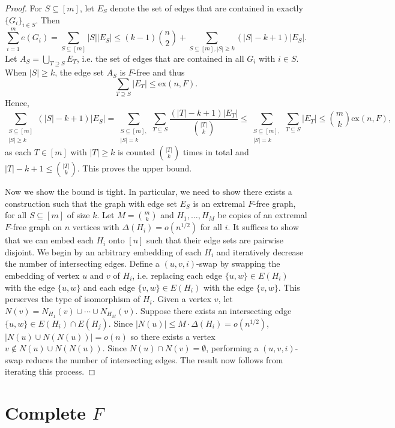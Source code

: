 \documentclass[10pt, reqno]{report}
\begin{document}
\begin{proof}
  For $S \subseteq [m]$, let $E_S$ denote the set of edges that are contained in exactly $\{G_i\}_{i \in S}$. Then 
  \[
    \sum_{i = 1}^m e(G_i) = \sum_{S \subseteq [m]} |S||E_S| \leq (k - 1)\binom{n}{2} + \sum_{S \subseteq [m], |S| \geq k} (|S| - k + 1)|E_S|.
  \]
  Let $A_S = \bigcup_{T \supseteq S} E_T$, i.e. the set of edges that are contained in all $G_i$ with $i \in S$. When $|S| \geq k$, the edge set $A_S$ is $F$-free and thus 
  \[
    \sum_{T \supseteq S} |E_T| \leq \text{ex}(n, F).
  \]
  Hence,
  \[
    \sum_{\substack{S \subseteq [m] \\ |S| \geq k}} (|S| - k + 1)|E_S| = \sum_{\substack{S \subseteq [m], \\ |S| = k}} \sum_{T \subseteq S} \frac{(|T| - k + 1)|E_T|}{\binom{|T|}{k}} \leq \sum_{\substack{S \subseteq [m], \\ |S| = k}} \sum_{T \subseteq S} |E_T| \leq \binom{m}{k}\text{ex}(n, F),
  \]
  as each $T \in [m]$ with $|T| \geq k$ is counted $\binom{|T|}{k}$ times in total and $|T| - k + 1 \leq \binom{|T|}{k}$. This proves the upper bound.

  Now we show the bound is tight. In particular, we need to show there exists a construction such that the graph with edge set $E_S$ is an extremal $F$-free graph, for all $S \subseteq [m]$ of size $k$. Let $M = \binom{m}{k}$ and $H_1, \ldots, H_M$ be copies of an extremal $F$-free graph on $n$ vertices with $\Delta(H_i) = o(n^{1/2})$ for all $i$. It suffices to show that we can embed each $H_i$ onto $[n]$ such that their edge sets are pairwise disjoint. We begin by an arbitrary embedding of each $H_i$ and iteratively decrease the number of intersecting edges. Define a $(u, v, i)$-swap by swapping the embedding of vertex $u$ and $v$ of $H_i$, i.e. replacing each edge $\{u, w\} \in E(H_i)$ with the edge $\{u, w\}$ and each edge $\{v, w\} \in E(H_i)$ with the edge $\{v, w\}$. This perserves the type of isomorphism of $H_i$. Given a vertex $v$, let $N(v) = N_{H_1}(v) \cup \cdots \cup N_{H_M}(v)$. Suppose there exists an intersecting edge $\{u, w\} \in E(H_i) \cap E(H_j)$. Since $|N(u)|
  \leq M \cdot \Delta(H_i) = o(n^{1/2})$, $|N(u) \cup N(N(u))| = o(n)$ so there exists a vertex $v \notin N(u) \cup N(N(u))$. Since $N(u) \cap N(v) = \emptyset$, performing a $(u, v, i)$-swap reduces the number of intersecting edges. The result now follows from iterating this process.
\end{proof}


\section{Complete $F$}
\end{document}
